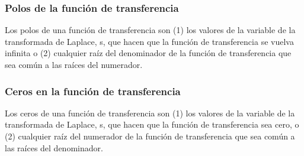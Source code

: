 \subsubsection{Polos de la función de transferencia}
Los polos de una función de transferencia son (1) los valores de la variable de la transformada de Laplace, s, que hacen que la función de
transferencia se vuelva infinita o (2) cualquier raíz del denominador de la función de transferencia que sea común a las raíces del numerador.
\subsubsection{Ceros en la función de transferencia}
Los ceros de una función de transferencia son (1) los valores de la variable de la transformada de Laplace, s, que hacen que la función de
transferencia sea cero, o (2) cualquier raíz del numerador de la función de transferencia que sea común a las raíces del denominador.
